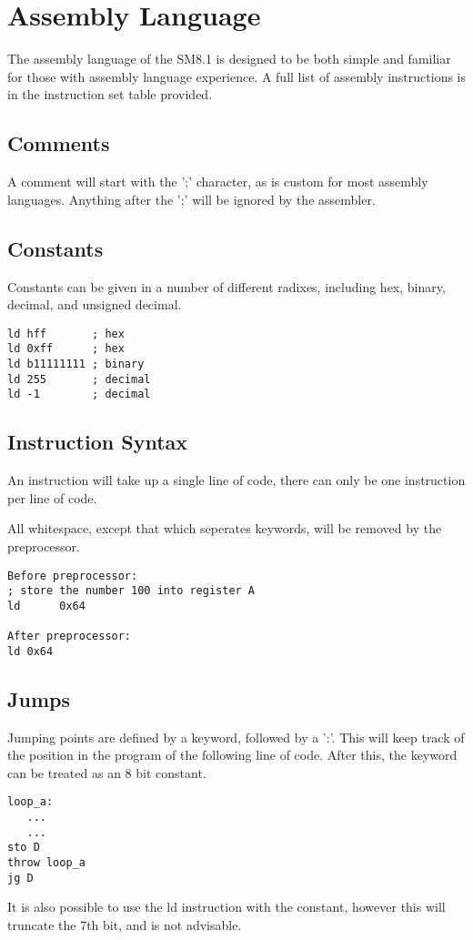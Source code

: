 \documentclass[11pt]{article}
\begin{document}
\section{Assembly Language}
The assembly language of the SM8.1 is designed to be both simple and familiar for those with assembly language experience. A full list of assembly instructions is in the instruction set table provided.

\subsection{Comments}
A comment will start with the ';' character, as is custom for most assembly languages. Anything after the ';' will be ignored by the assembler.
\subsection{Constants}
Constants can be given in a number of different radixes, including hex, binary, decimal, and unsigned decimal.
\begin{verbatim}
ld hff       ; hex
ld 0xff      ; hex
ld b11111111 ; binary
ld 255       ; decimal
ld -1        ; decimal 
\end{verbatim}
\subsection{Instruction Syntax}
An instruction will take up a single line of code, there can only be one instruction per line of code.

All whitespace, except that which seperates keywords, will be removed by the preprocessor.
\begin{verbatim}
Before preprocessor:
; store the number 100 into register A
ld      0x64

After preprocessor:
ld 0x64
\end{verbatim}
\subsection{Jumps}
Jumping points are defined by a keyword, followed by a ':'. This will keep track of the position in the program of the following line of code. After this, the keyword can be treated as an 8 bit constant.
\begin{verbatim}
loop_a:
   ...
   ...
sto D
throw loop_a
jg D
\end{verbatim}
It is also possible to use the ld instruction with the constant, however this will truncate the 7th bit, and is not advisable.
\end{document}
